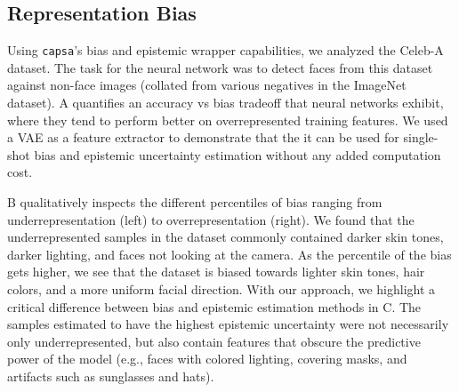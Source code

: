 \documentclass{article} %
\def\capsa{\texttt{{capsa}}}
\begin{document}
\subsection{Representation Bias}

Using \capsa's bias and epistemic wrapper capabilities, we analyzed the Celeb-A \citep{liu2015faceattributes} dataset. The task for the neural network was to detect faces from this dataset against non-face images (collated from various negatives in the ImageNet dataset).  A quantifies an accuracy vs bias tradeoff that neural networks exhibit, where they tend to perform better on overrepresented training features. We used a VAE as a feature extractor to demonstrate that the it can be used for single-shot bias and epistemic uncertainty estimation without any added computation cost.
    
B qualitatively inspects the different percentiles of bias ranging from underrepresentation (left) to overrepresentation (right). We found that the underrepresented samples in the dataset commonly contained darker skin tones, darker lighting, and faces not looking at the camera. As the percentile of the bias gets higher, we see that the dataset is biased towards lighter skin tones, hair colors, and a more uniform facial direction. With our approach, we highlight a critical difference between bias and epistemic estimation methods in C. The samples estimated to have the highest epistemic uncertainty were not necessarily only underrepresented, but also contain features that obscure the predictive power of the model (e.g., faces with colored lighting, covering masks, and artifacts such as sunglasses and hats). 
\end{document}

